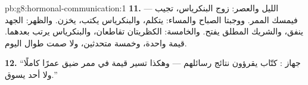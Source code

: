 \begin{solution}{pb:g8:hormonal-communication:1}
\textbf{11.} الليل والعصر: زوج البنكرياس، 
 تجيب --- فيمسك الممر. ووجبتا الصباح والمساء:
 يتكلم، والبنكرياس يكتب،  يخزن. والظهر:
الجهد ينفق، والشريك المطلق يفتح. والخامسة: الكظريتان
تقاطعان، والبنكرياس يرتب بعدهما. قيمة واحدة، وخمسة
متحدثين، ولا صمت طوال اليوم.

\textbf{12.} ``جهاز : كتّاب يقرؤون نتائج
رسائلهم --- وهكذا تسير قيمة في ممر ضيق عمرًا كاملًا ولا
أحد يسوق.''
\end{solution}
